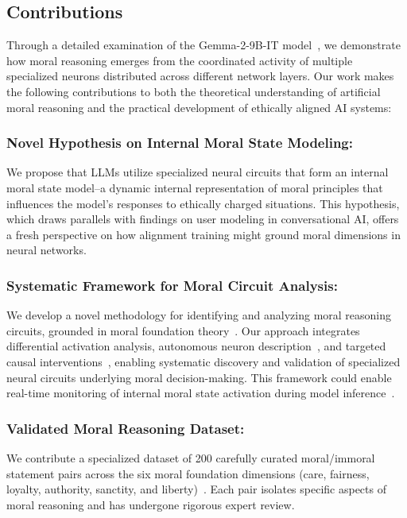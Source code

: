 \documentclass[runninghheads]{llncs}
\begin{document}
\subsection{Contributions}

Through a detailed examination of the Gemma-2-9B-IT model~\cite{Gemma2024}, we demonstrate how moral reasoning emerges from the coordinated activity of multiple specialized neurons distributed across different network layers. Our work makes the following contributions to both the theoretical understanding of artificial moral reasoning and the practical development of ethically aligned AI systems:

\subsubsection{Novel Hypothesis on Internal Moral State Modeling:}
We propose that LLMs utilize specialized neural circuits that form an internal moral state model--a dynamic internal representation of moral principles that influences the model's responses to ethically charged situations. This hypothesis, which draws parallels with findings on user modeling in conversational AI, offers a fresh perspective on how alignment training might ground moral dimensions in neural networks.

\subsubsection{Systematic Framework for Moral Circuit Analysis:}
We develop a novel methodology for identifying and analyzing moral reasoning circuits, grounded in moral foundation theory~\cite{Haidt2004}. Our approach integrates differential activation analysis, autonomous neuron description~\cite{bills2023language}, and targeted causal interventions~\cite{Yamakoshi2023}, enabling systematic discovery and validation of specialized neural circuits underlying moral decision-making. This framework could enable real-time monitoring of internal moral state activation during model inference~\cite{chen_designing_2024}.

\subsubsection{Validated Moral Reasoning Dataset:}
We contribute a specialized dataset of 200 carefully curated moral/immoral statement pairs across the six moral foundation dimensions (care, fairness, loyalty, authority, sanctity, and liberty)~\cite{Haidt2012}. Each pair isolates specific aspects of moral reasoning and has undergone rigorous expert review.
\end{document}
